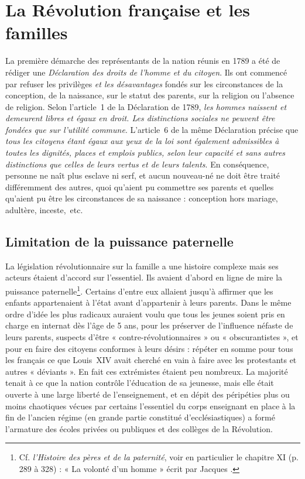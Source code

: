 

\chapter{La Révolution française et les familles}


 La première démarche des représentants de la nation réunis en 1789 a été de rédiger une \emph{Déclaration des droits de l'homme et du citoyen}. Ils ont commencé par refuser les privilèges \emph{et les désavantages} fondés sur les circonstances de la conception, de la naissance, sur le statut des parents, sur la religion ou l'absence de religion. Selon l'article~1 de la Déclaration de 1789, \emph{les hommes naissent et demeurent libres et égaux en droit. Les distinctions sociales ne peuvent être fondées que sur l'utilité commune}. L'article~6 de la même Déclaration précise que \emph{tous les citoyens étant égaux aux yeux de la loi sont également admissibles à toutes les dignités, places et emplois publics, selon leur capacité et sans autres distinctions que celles de leurs vertus et de leurs talents}. En conséquence, personne ne naît plus esclave ni serf, et aucun nouveau-né ne doit être traité différemment des autres, quoi qu'aient pu commettre ses parents et quelles qu'aient pu être les circonstances de sa naissance : conception hors mariage, adultère, inceste,~etc. 


\section{Limitation de la puissance paternelle}

 La législation révolutionnaire sur la famille a une histoire complexe mais ses acteurs étaient d'accord sur l'essentiel. Ils avaient d'abord en ligne de mire la puissance paternelle\footnote{Cf. \emph{l'Histoire des pères et de la paternité}, voir en particulier le chapitre XI (p. 289 à 328) : « La volonté d'un homme » écrit par Jacques .}. 
Certains d'entre eux allaient jusqu'à affirmer que les enfants appartenaient à l'état avant d'appartenir à leurs parents. Dans le même ordre d'idée les plus radicaux auraient voulu que tous les jeunes soient pris en charge en internat dès l'âge de 5 ans, pour les préserver de l'influence néfaste de leurs parents, suspects d'être « contre-révolutionnaires » ou « obscurantistes », et pour en faire des citoyens conformes à leurs désirs : répéter en somme pour tous les français ce que Louis~XIV avait cherché en vain à faire avec les protestants et autres « déviants ». En fait ces extrémistes étaient peu nombreux. La majorité tenait à ce que la nation contrôle l'éducation de sa jeunesse, mais elle était ouverte à une large liberté de l'enseignement, et en dépit des péripéties plus ou moins chaotiques vécues par certains l'essentiel du corps enseignant en place à la fin de l'ancien régime (en grande partie constitué d'ecclésiastiques) a formé l'armature des écoles privées ou publiques et des collèges de la Révolution.  

